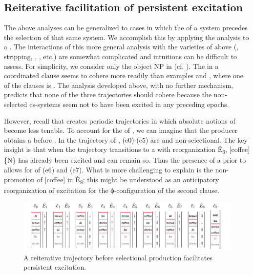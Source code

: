 \subsection{Reiterative facilitation of persistent excitation}

The above analyses can be generalized to cases in which the  of a system precedes the selection of that same system. We accomplish this by applying the  analysis to a . The interactions of this more general analysis with the varieties of  above (, stripping,  , , etc.) are somewhat complicated and intuitions can be difficult to assess. For simplicity, we consider only the object NP  in  (cf. \citealt{Wilder1997}). The  in a coordinated clause  seems to cohere more readily than examples  and , where one of the clauses is . The  analysis developed above, with no further mechanism, predicts that none of the three trajectories should cohere because the non-selected cs-systems seem not to have been excited in any preceding epochs.

\ea\label{ex:7:7}
\label{ex:7:7a}
\label{ex:7:7b}
\label{ex:7:7c}
\z
\z

  However, recall that  creates periodic trajectories in which absolute notions of  become less tenable. To account for the  of , we can imagine that the producer obtains a  before . In the trajectory of {}, (e0)-(e5) are  and non-selectional. The key insight is that when the trajectory transitions to a  with reorganization Ê\textsubscript{6}, [coffee]\{N\} has already been excited and can remain so. Thus the presence of a  prior to  allows for  of (e6) and (e7). What is more challenging to explain is the non-promotion of [coffee] in Ê\textsubscript{8}; this might be understood as an anticipatory reorganization of excitation for the ϕ-configuration of the second clause.

  
\begin{figure}
\includegraphics[width=\textwidth]{figures/Tilsen-img150.png}
\caption{A reiterative trajectory before selectional production facilitates persistent excitation.}
\label{fig:7:6}
\end{figure}
 

